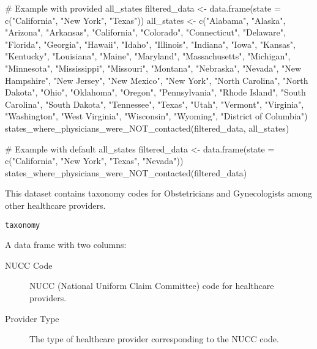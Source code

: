 \documentclass[a4paper]{book}
\begin{document}
\begin{Examples}
\begin{ExampleCode}
# Example with provided all_states
filtered_data <- data.frame(state = c("California", "New York", "Texas"))
all_states <- c("Alabama", "Alaska", "Arizona", "Arkansas", "California", "Colorado",
                 "Connecticut", "Delaware", "Florida", "Georgia", "Hawaii", "Idaho",
                 "Illinois", "Indiana", "Iowa", "Kansas", "Kentucky", "Louisiana",
                 "Maine", "Maryland", "Massachusetts", "Michigan", "Minnesota",
                 "Mississippi", "Missouri", "Montana", "Nebraska", "Nevada",
                 "New Hampshire", "New Jersey", "New Mexico", "New York",
                 "North Carolina", "North Dakota", "Ohio", "Oklahoma", "Oregon",
                 "Pennsylvania", "Rhode Island", "South Carolina", "South Dakota",
                 "Tennessee", "Texas", "Utah", "Vermont", "Virginia",
                 "Washington", "West Virginia", "Wisconsin", "Wyoming",
                 "District of Columbia")
states_where_physicians_were_NOT_contacted(filtered_data, all_states)

# Example with default all_states
filtered_data <- data.frame(state = c("California", "New York", "Texas", "Nevada"))
states_where_physicians_were_NOT_contacted(filtered_data)

\end{ExampleCode}
\end{Examples}
%
\begin{Description}
This dataset contains taxonomy codes for Obstetricians and Gynecologists among other healthcare providers.
\end{Description}
%
\begin{Usage}
\begin{verbatim}
taxonomy
\end{verbatim}
\end{Usage}
%
\begin{Format}
A data frame with two columns:
\begin{description}

\item[NUCC Code] NUCC (National Uniform Claim Committee) code for healthcare providers.
\item[Provider Type] The type of healthcare provider corresponding to the NUCC code.

\end{description}

\end{Format}
\end{document}
